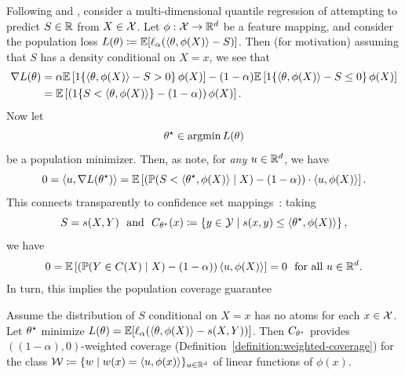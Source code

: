 \documentclass[11pt]{article}
\newcommand{\loss}{\ell}
\newcommand{\poploss}{L}
\newcommand{\scorefunc}{s}
\newcommand{\scoreval}{\scorefunc}
\newcommand{\scorerv}{S}
\begin{document}
Following \citet{GibbsChCa23} and \citet{JungNoRaRo23},
consider a multi-dimensional quantile regression
of attempting to predict $\scorerv \in \R$ from $X \in \mathcal{X}$.
%
Let $\phi : \mathcal{X} \to \mathbb{R}^d$ be a feature mapping, and consider the population
loss $\poploss(\theta) \defeq \E[\loss_\alpha(\<\theta, \phi(X)\> - \scorerv)]$.
%
Then (for motivation) assuming that $\scorerv$ has a density
conditional on $X = x$, we see that
\begin{align*}
  \nabla \poploss(\theta)
  & = \alpha \E\left[\indic{\<\theta, \phi(X)\> - \scorerv > 0}
    \phi(X)\right]
  - (1 - \alpha) \E\left[\indic{\<\theta, \phi(X)\> - \scorerv \le 0} \phi(X)
    \right] \\
  & = \E\left[\left(\indic{\scorerv < \<\theta, \phi(X)\>} - (1 - \alpha)\right)
    \phi(X) \right].
\end{align*}
Now let
\begin{equation*}
  \theta\opt \in \argmin \poploss(\theta)
\end{equation*}
be a population minimizer.
%
Then, as \citet{GibbsChCa23} note, for \emph{any} $u \in \mathbb{R}^d$, we have
\begin{equation*}
  0 = \<u, \nabla \poploss(\theta\opt)\>
  = \E\left[\left(\P(\scorerv < \<\theta\opt, \phi(X)\> \mid X)
    - (1 - \alpha)\right) \cdot \<u, \phi(X)\> \right].
\end{equation*}
This connects transparently to confidence set
mappings~\cite{GibbsChCa23,JungNoRaRo23}: taking
\begin{equation*}
  \scorerv = \scoreval(X, Y)
  ~~ \mbox{and} ~~
  C_{\theta\opt}(x) \defeq \left\{y \in \mc{Y} \mid \scoreval(x, y) \le
  \<\theta\opt, \phi(X)\>\right\},
\end{equation*}
we have
\begin{align*}
  0 = \mathbb{E}\left[\left(\mathbb{P}(Y \in C(X) \mid X) - (1 - \alpha)\right)
    \langle u, \phi(X)\rangle\right] = 0
  ~~ \mbox{for~all~} u \in \mathbb{R}^d.
\end{align*}
In turn, this implies the population coverage guarantee
\begin{corollary}
  \label{corollary:population-weighted-coverage}
  Assume the distribution of $\scorerv$ conditional on $X = x$ has no atoms
  for each $x \in \mathcal{X}$. Let $\theta^\star$ minimize $\poploss(\theta) =
  \E[\loss_\alpha(\<\theta, \phi(X)\> - \scoreval(X, Y))]$.
  Then $C_{\theta^\star}$ provides $((1 - \alpha), 0)$-weighted coverage
  (Definition~\ref{definition:weighted-coverage}) for the class $\mathcal{W}
  \coloneqq \{w \mid w(x) = \langle u, \phi(x)\rangle\}_{u \in \mathbb{R}^d}$ of linear functions
  of $\phi(x)$.
\end{corollary}
\end{document}

